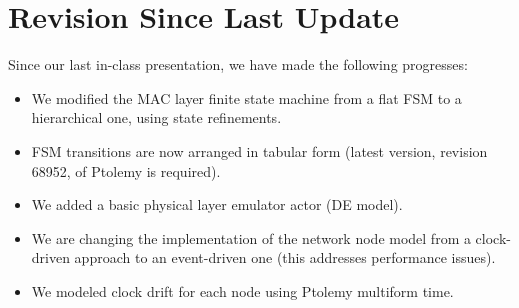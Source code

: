 \section{Revision Since Last Update}
\label{sec:revision-since-last}

Since our last in-class presentation, we have made the following progresses:

\begin{itemize}
\item We modified the MAC layer finite state machine from a flat FSM to a hierarchical one, using state refinements.
\item FSM transitions are now arranged in tabular form (latest version, revision 68952, of Ptolemy is required).
\item We added a basic physical layer emulator actor (DE model).
\item We are changing the implementation of the network node model from a clock-driven approach to an event-driven one (this addresses performance issues).
\item We modeled clock drift for each node using Ptolemy multiform time.
\end{itemize}


